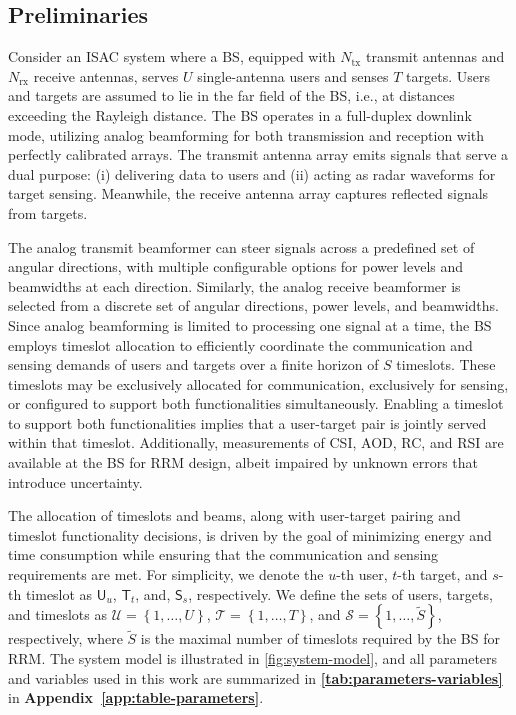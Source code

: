 \documentclass[10pt,journal,compsoc]{IEEEtran}
\theoremstyle{myremark}
\theoremstyle{myexample}
\begin{document}
\subsection{Preliminaries}

Consider an \gls{ISAC} system where a \gls{BS}, equipped with $ N_\mathrm{tx} $ transmit antennas and $ N_\mathrm{rx} $ receive antennas, serves $ U $ single-antenna users and senses $ T $ targets. Users and targets are assumed to lie in the far field of the \gls{BS}, i.e., at distances exceeding the Rayleigh distance. The \gls{BS} operates in a full-duplex downlink mode, utilizing analog beamforming for both transmission and reception with perfectly calibrated arrays. The transmit antenna array emits signals that serve a dual purpose: (i) delivering data to users and (ii) acting as radar waveforms for target sensing. Meanwhile, the receive antenna array captures reflected signals from targets.


The analog transmit beamformer can steer signals across a predefined set of angular directions, with multiple configurable options for power levels and beamwidths at each direction. Similarly, the analog receive beamformer is selected from a discrete set of angular directions, power levels, and beamwidths. Since analog beamforming is limited to processing one signal at a time, the \gls{BS} employs timeslot allocation to efficiently coordinate the communication and sensing demands of users and targets over a finite horizon of $ S $ timeslots. These timeslots may be exclusively allocated for communication, exclusively for sensing, or configured to support both functionalities simultaneously. Enabling a timeslot to support both functionalities implies that a user-target pair is jointly served within that timeslot. Additionally, measurements of \gls{CSI}, \gls{AOD}, \gls{RC}, and \gls{RSI} are available at the \gls{BS} for \gls{RRM} design, albeit impaired by unknown errors that introduce uncertainty.





The allocation of timeslots and beams, along with user-target pairing and timeslot functionality decisions, is driven by the goal of minimizing energy and time consumption while ensuring that the communication and sensing requirements are met. For simplicity, we denote the $u$-th user, $t$-th target, and $s$-th timeslot as $ \mathsf{U}_u $, $ \mathsf{T}_t $, and, $ \mathsf{S}_s $, respectively. We define the sets of users, targets, and timeslots as $ \mathcal{U} = \left\lbrace 1, \dots, U \right\rbrace $, $ \mathcal{T} = \left\lbrace 1, \dots, T \right\rbrace $, and $ \mathcal{S} = \left\lbrace 1, \dots, \widetilde{S} \right\rbrace $, respectively, where $ \widetilde{S} $ is the maximal number of timeslots required by the \gls{BS} for RRM. The system model is illustrated in \cref{fig:system-model}, and all parameters and variables used in this work are summarized in \textbf{\cref{tab:parameters-variables}} in \textbf{Appendix~\ref{app:table-parameters}}.
\end{document}
